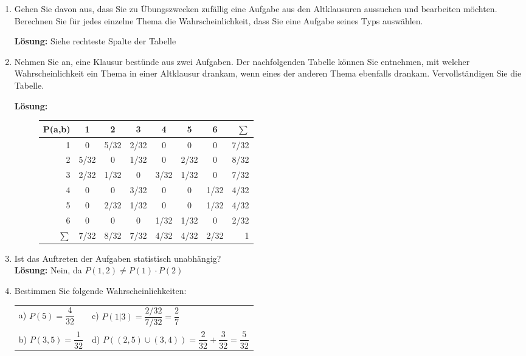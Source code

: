 \documentclass[11pt, a4paper]{article}
\begin{document}
\begin{enumerate}[label=\alph*)]
\item Gehen Sie davon aus, dass Sie zu Übungszwecken zufällig eine Aufgabe aus den Altklausuren aussuchen und bearbeiten möchten. Berechnen Sie für jedes einzelne Thema die Wahrscheinlichkeit, dass Sie eine Aufgabe seines Typs auswählen.

\textbf{Lösung:} Siehe rechteste Spalte der Tabelle
\item Nehmen Sie an, eine Klausur bestünde aus zwei Aufgaben. Der nachfolgenden Tabelle können Sie entnehmen, mit welcher Wahrscheinlichkeit ein Thema in einer Altklausur drankam, wenn eines der anderen Thema ebenfalls drankam. Vervollständigen Sie die Tabelle.

\textbf{Lösung:}
\begin{figure}[h!]
\centering
\setlength\extrarowheight{5pt}
\begin{tabular}{r|cccccc|r}
	P(a,b)	& 1 	& 2 	& 3 	& 4 	& 5 	& 6 	& $\sum$\\ \hline
	1 		& 0 	& 5/32 	& 2/32 	& 0  	& 0  	& 0 	& 7/32 \\
	2 		& 5/32	& 0		& 1/32 	& 0 	& 2/32 	& 0 	& 8/32 \\
	3 		& 2/32	& 1/32 	& 0 	& 3/32 	& 1/32 	& 0  	& 7/32 \\
	4 		& 0		& 0 	& 3/32 	& 0 	& 0  	& 1/32 	& 4/32 \\
	5 		& 0  	& 2/32 	& 1/32 	& 0 	& 0  	& 1/32 	& 4/32 \\
	6 		& 0 	& 0 	& 0  	& 1/32 	& 1/32 	& 0 	& 2/32 \\ \hline
	$\sum$ 	& 7/32 	& 8/32 	& 7/32 	& 4/32 	& 4/32 	& 2/32  & 1\\
\end{tabular}
\end{figure}

\item Ist das Auftreten der Aufgaben statistisch unabhängig?\\
\textbf{Lösung:} Nein, da $P(1, 2) \neq P(1) \cdot P(2)$
\item Bestimmen Sie folgende Wahrscheinlichkeiten:

	\begin{tabular}{ll}
	a) $P(5) = \dfrac{4}{32}$ \hspace{4cm} 				& c) $P(1|3) = \dfrac{2/32}{7/32} = \dfrac{2}{7}$ \\
	b) $P(3, 5) = \dfrac{1}{32}$ 					& d) $P((2, 5) \cup (3, 4)) = \dfrac{2}{32} + \dfrac{3}{32} = \dfrac{5}{32}$
	\end{tabular}

\end{enumerate}
\end{document}
